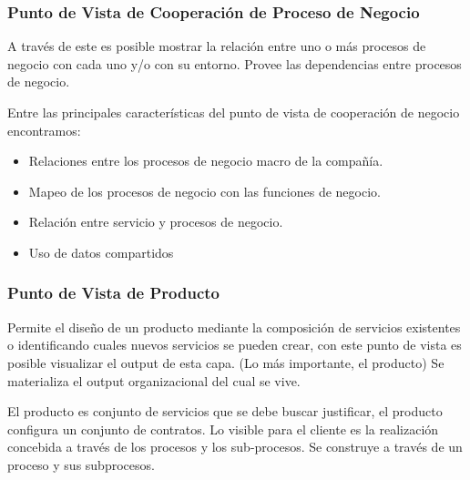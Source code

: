 \subsubsection{Punto de Vista de Cooperación de Proceso de Negocio}
A través de este es posible mostrar la relación entre uno o más procesos de negocio con cada uno y/o con su entorno. Provee las dependencias entre procesos de negocio.

Entre las principales características del punto de vista de cooperación de negocio encontramos:
\begin{itemize}
	\item Relaciones entre los procesos de negocio macro de la compañía.
	\item Mapeo de los procesos de negocio con las funciones de negocio.
	\item Relación entre servicio y procesos de negocio.
	\item Uso de datos compartidos
\end{itemize}

\begin{figure}[th!]
	\centering
	
	\label{fig:morganizacion}
\end{figure}

\subsubsection{Punto de Vista de Producto}
Permite el diseño de un producto mediante la composición de servicios existentes o identificando cuales nuevos servicios se pueden crear, con este punto de vista es posible visualizar el output de esta capa. (Lo más importante, el producto) Se materializa el output organizacional del cual se vive.

El producto es conjunto de servicios que se debe buscar justificar, el producto configura un conjunto de contratos.
Lo visible para el cliente es la realización concebida a través de los procesos y los sub-procesos. Se construye a través de un proceso y sus subprocesos.